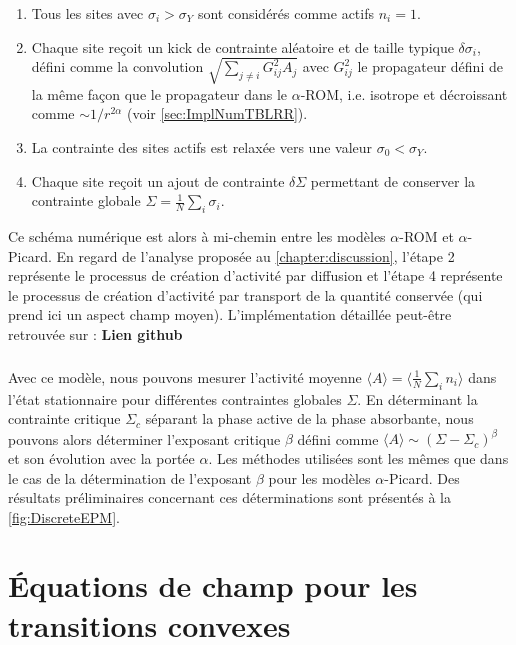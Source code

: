 \begin{enumerate}
	\item Tous les sites avec $\sigma_i > \sigma_Y$ sont considérés comme actifs $n_i=1$.
	\item Chaque site reçoit un kick de contrainte aléatoire et de taille typique $\delta\sigma_i$, défini comme la convolution $\sqrt{\sum_{j\neq i}G_{ij}^2A_j}$ avec $G_{ij}^2$ le propagateur défini de la même façon que le propagateur dans le $\alpha$-ROM, i.e. isotrope et décroissant comme $\sim 1/r^{2\alpha}$ (voir \autoref{sec:ImplNumTBLRR}).
	\item La contrainte des sites actifs est relaxée vers une valeur $\sigma_0 < \sigma_Y$.
	\item Chaque site reçoit un ajout de contrainte $\delta\Sigma$ permettant de conserver la contrainte globale $\Sigma = \frac{1}{N}\sum_{i}\sigma_i$.
\end{enumerate}

\noindent Ce schéma numérique est alors à mi-chemin entre les modèles $\alpha$-ROM et $\alpha$-Picard. En regard de l'analyse proposée au \autoref{chapter:discussion}, l'étape 2 représente le processus de création d'activité par diffusion et l'étape 4 représente le processus de création d'activité par transport de la quantité conservée (qui prend ici un aspect champ moyen). L'implémentation détaillée peut-être retrouvée sur : \textbf{Lien github}

\subparagraph{}Avec ce modèle, nous pouvons mesurer l'activité moyenne $\langle A \rangle = \langle \frac{1}{N}\sum_{i}n_i \rangle $ dans l'état stationnaire pour différentes contraintes globales $\Sigma$. En déterminant la contrainte critique $\Sigma_c$ séparant la phase active de la phase absorbante, nous pouvons alors déterminer l'exposant critique $\beta$ défini comme $\langle A \rangle \sim (\Sigma - \Sigma_c)^\beta$ et son évolution avec la portée $\alpha$. Les méthodes utilisées sont les mêmes que dans le cas de la détermination de l'exposant $\beta$ pour les modèles $\alpha$-Picard. Des résultats préliminaires concernant ces déterminations sont présentés à la \autoref{fig:DiscreteEPM}.

\FloatBarrier

\section{Équations de champ pour les transitions convexes}

\stoptocwriting

\label{sec:eqchampconvexe}

